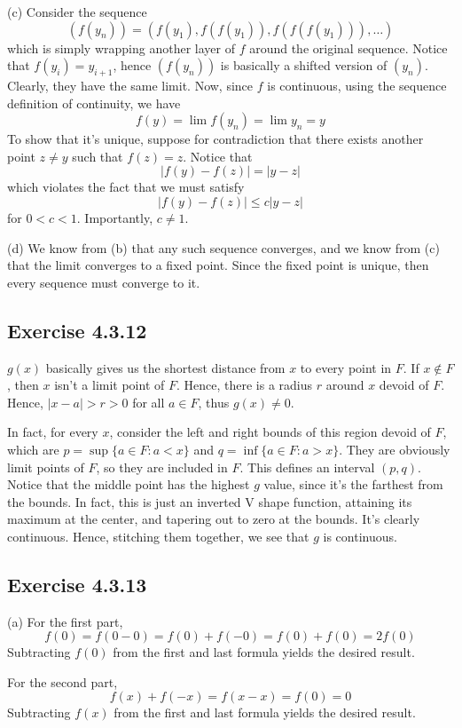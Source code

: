 \documentclass{book}
\begin{document}
\noindent
(c)
Consider the sequence
$$(f(y_n)) = (f(y_1), f(f(y_1)), f(f(f(y_1))), \ldots)$$
which is simply wrapping another layer of $f$ around the original sequence. Notice that $f(y_i) = y_{i + 1}$, hence $(f(y_n))$ is basically a shifted version of $(y_n)$. Clearly, they have the same limit. Now, since $f$ is continuous, using the sequence definition of continuity, we have
$$f(y) = \lim f(y_n) = \lim y_n = y$$
To show that it's unique, suppose for contradiction that there exists another point $z \neq y$ such that $f(z) = z$. Notice that
$$|f(y) - f(z)| = |y - z|$$
which violates the fact that we must satisfy
$$|f(y) - f(z)| \leq c |y - z|$$
for $0 < c < 1$. Importantly, $c \neq 1$.

\noindent
(d)
We know from (b) that any such sequence converges, and we know from (c) that the limit converges to a fixed point. Since the fixed point is unique, then every sequence must converge to it.

\subsection*{Exercise 4.3.12}
$g(x)$ basically gives us the shortest distance from $x$ to every point in $F$. If $x \not \in F$, then $x$ isn't a limit point of $F$. Hence, there is a radius $r$ around $x$ devoid of $F$. Hence, $|x - a| > r > 0$ for all $a \in F$, thus $g(x) \neq 0$.

In fact, for every $x$, consider the left and right bounds of this region devoid of $F$, which are $p = \sup \{ a \in F : a < x \}$ and $q = \inf \{ a \in F : a > x \}$. They are obviously limit points of $F$, so they are included in $F$. This defines an interval $(p, q)$. Notice that the middle point has the highest $g$ value, since it's the farthest from the bounds. In fact, this is just an inverted V shape function, attaining its maximum at the center, and tapering out to zero at the bounds. It's clearly continuous. Hence, stitching them together, we see that $g$ is continuous.

\subsection*{Exercise 4.3.13}
(a)
For the first part,
$$f(0) = f(0 - 0) = f(0) + f(-0) = f(0) + f(0) = 2f(0)$$
Subtracting $f(0)$ from the first and last formula yields the desired result.

For the second part,
$$f(x) + f(-x) = f(x - x) = f(0) = 0$$
Subtracting $f(x)$ from the first and last formula yields the desired result.
\end{document}
